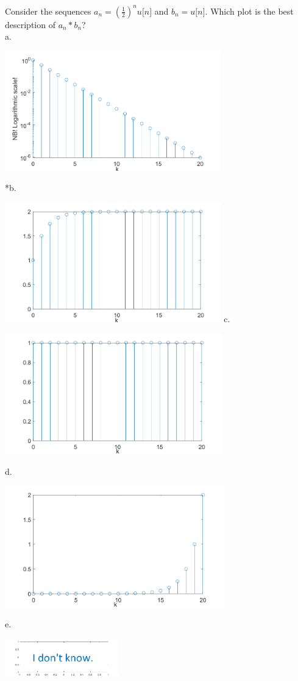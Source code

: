 
Consider the sequences \(a_{n} = \left( \frac{1}{2} \right)^{n}u\lbrack n\rbrack\) and \(b_{n} = u\lbrack n\rbrack\). Which plot is the best description of \(a_{n}*b_{n}\)?\\

a.

\includegraphics[width=3.69114in,height=2.04177in]{../../Images/ConvolutionQ3a.png}

*b. 

\includegraphics[width=3.69456in,height=2.04366in]{../../Images/ConvolutionQ3b.png}
c. 

\includegraphics[width=3.71765in,height=2.05643in]{../../Images/ConvolutionQ3c.png}

d. 

\includegraphics[width=3.73465in,height=2.06763in]{../../Images/ConvolutionQ3d.png}

e. 

\includegraphics[width=1.94778in,height=0.63207in]{../../Images/AnswerEGraph.png}\\
